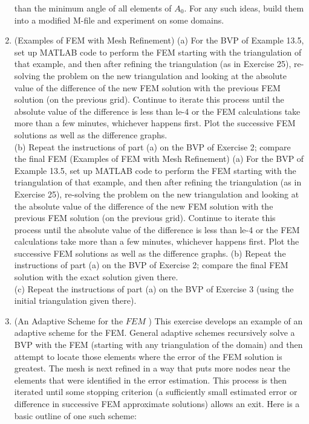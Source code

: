 \documentclass[../main.tex]{subfiles}
\begin{document}
\begin{enumerate}
than the minimum angle of all elements of \textit{$A_0$}. For any such ideas, build them into a 
modified M-file and experiment on some domains.  
	\item (Examples of FEM with Mesh Refinement) (a) For the BVP of Example 13.5, set up MATLAB code to perform the FEM starting with the triangulation of that example, and then after refining the triangulation (as in Exercise 25), re-solving the problem on the new triangulation and looking at the absolute value of the difference of the new FEM solution with the previous FEM solution (on the previous grid). Continue to iterate this process until the absolute value of the difference is less than le-4 or the FEM calculations take more than a few minutes, whichever happens first. Plot the successive FEM solutions as well as the difference graphs.\\
(b) Repeat the instructions of part (a) on the BVP of Exercise 2; compare the final FEM (Examples of FEM with Mesh Refinement) (a) For the BVP of Example 13.5, set up MATLAB code to perform the FEM starting with the triangulation of that example, and then after refining the triangulation (as in Exercise 25), re-solving the problem on the new triangulation and looking at the absolute value of the difference of the new FEM solution with the previous FEM solution (on the previous grid). Continue to iterate this process until the absolute value of the difference is less than le-4 or the FEM calculations take more than a few minutes, whichever happens first. Plot the successive FEM solutions as well as the difference graphs.
(b) Repeat the instructions of part (a) on the BVP of Exercise 2; compare the final FEM solution with the exact solution given there. \\
(c) Repeat the instructions of part (a) on the BVP of Exercise 3 (using the initial triangulation 
given there). 
	\item (An Adaptive Scheme for the $F E M$ ) This exercise develops an example of an adaptive scheme for the FEM. General adaptive schemes recursively solve a BVP with the FEM (starting with any triangulation of the domain) and then attempt to locate those elements where the error of the FEM solution is greatest. The mesh is next refined in a way that puts more nodes near the elements that were identified in the error estimation. This process is then iterated until some stopping criterion (a sufficiently small estimated error or difference in successive FEM approximate solutions) allows an exit. Here is a basic outline of one such scheme:\\

\end{enumerate}
\end{document}

